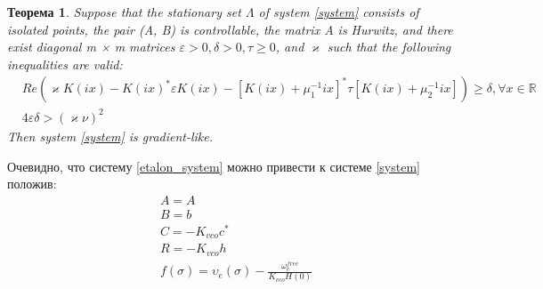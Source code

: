 \documentclass[a4paper]{article}
\newtheorem{theorem}{Теорема}
\begin{document}
\begin{theorem}
Suppose that the stationary set $\Lambda$ of system \ref{system} consists of isolated points, the pair (A, B) is controllable, the matrix A is Hurwitz, and there exist diagonal m × m matrices $\varepsilon > 0, \delta > 0, \tau \geq 0$, and $\varkappa$ such that the following inequalities are valid:
 \begin{equation}
 \begin{aligned}
&Re(\varkappa K(ix)-K(ix)^*\varepsilon K(ix)-[K(ix)+\mu_1^{-1}ix]^*\tau[K(ix)+\mu_2^{-1}ix])\geq\delta, \forall x \in \mathbb{R}\\
&4\varepsilon\delta > (\varkappa\nu)^2
 \end{aligned}
\end{equation}
Then system \ref{system} is gradient-like.
\end{theorem}

Очевидно, что систему \ref{etalon_system} можно привести к системе  \ref{system} положив: 
 \begin{equation}
 \begin{aligned}
&A=A\\
&B = b\\
&C = -K_{vco}c^*\\
&R = -K_{vco}h\\
&f(\sigma) = \upsilon_e(\sigma) - \frac{\omega_e^{free}}{K_{vco}H(0)}
\end{aligned}
\end{equation}
\end{document}
